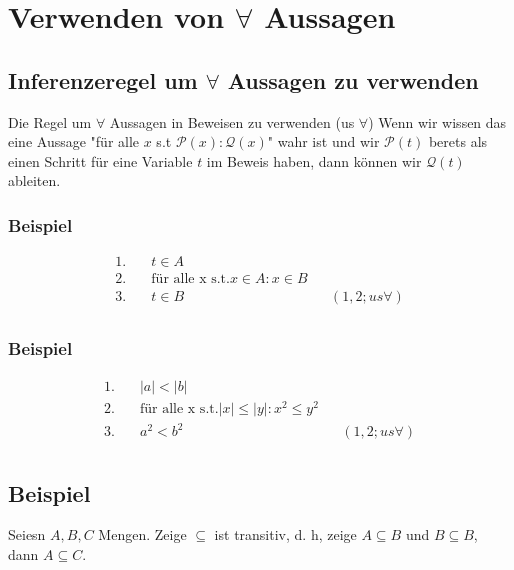 \section{Verwenden von $\forall$ Aussagen}
\subsection{Inferenzeregel um $\forall$ Aussagen zu verwenden}
{
    Die Regel um $\forall$ Aussagen in Beweisen zu verwenden (us $\forall$)
    }
{
    Wenn wir wissen das eine Aussage "für alle $x$ s.t $\mathcal{P}(x) : \mathcal{Q}(x)$" wahr ist und wir $\mathcal{P}(t)$ berets als einen Schritt für eine Variable $t$ im Beweis haben, dann können wir $\mathcal{Q}(t)$ ableiten.
}

\subsubsection{Beispiel}

    \begin{align*}
        1. &\quad t \in A                   && \\
        2. &\quad \text{für alle x s.t.} x \in A : x \in B                      && \\
        3. &\quad t \in B && (1, 2; us \forall)\\
    \end{align*}    

\subsubsection{Beispiel}

\begin{align*}
    1. &\quad |a| < |b|                   && \\
    2. &\quad \text{für alle x s.t.} |x| \leq |y| : x^2 \leq y^2                      && \\
    3. &\quad a^2 < b^2 && (1, 2; us \forall)\\
\end{align*}    

\subsection{Beispiel}
Seiesn $A, B, C$ Mengen. Zeige $\subseteq$ ist transitiv, d. h, zeige $A \subseteq B$ und $B \subseteq B$, dann $A \subseteq C$.


